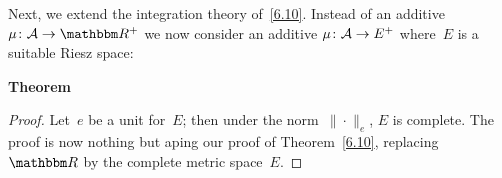 \documentclass[main.tex]{subfiles}
\begin{document}
%
%
\begin{psec}{7.11}%
Next,
we extend the integration theory of~\ref{6.10}.
Instead of an additive $\mu\colon \mathcal A\ra\R^+$
we now consider an additive $\mu\colon \mathcal A\rightarrow E^+$
where~$E$ is a suitable Riesz space:

\vspace{.5em}
\noindent\textbf{Theorem}\  
\end{psec}
\begin{proof}
Let~$e$ be a unit for~$E$;
then under the norm~$\|\cdot\|_e$,
$E$ is complete.
The proof is now nothing but aping our proof of Theorem~\ref{6.10},
replacing~$\R$ by the complete metric space~$E$. \xqed
\end{proof}
%
%
%
\clearpage
\end{document}
